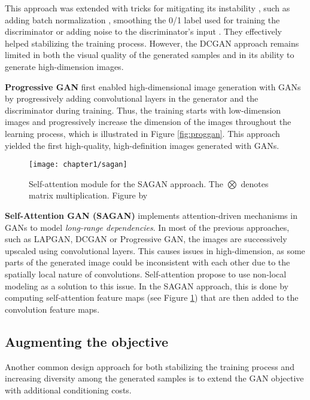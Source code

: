 This approach was extended  with tricks for mitigating its instability \citep{Salimans2016}, such as adding batch normalization \citep{Ioffe2015}, smoothing the 0/1 label used for training the discriminator or adding noise to the discriminator's input \citep{Sonderby2017}. They effectively helped stabilizing the training process. However, the \ac{DCGAN} approach remains limited in both the visual quality of the generated samples and in its ability to generate high-dimension images.

\textbf{Progressive GAN} \citep{Karras2017} first enabled high-dimensional image generation with GANs by progressively adding convolutional layers in the generator and the discriminator during training. Thus, the training starts with low-dimension images and progressively increase the dimension of the images throughout the learning process, which is illustrated in Figure \ref{fig:proggan}. This approach yielded the first high-quality, high-definition images generated with \ac{GANs}.

\begin{figure}
	\centering
	\texttt{[image: chapter1/sagan]}
	\caption[Self-attention module]{Self-attention module for the SAGAN approach. The $\bigotimes$ denotes matrix multiplication. Figure by \citet{Zhang2018}}
	\label{fig:sagan}
\end{figure}

\textbf{Self-Attention GAN (SAGAN)} \citep{Zhang2018} implements attention-driven  mechanisms in \ac{GANs} to model \textit{long-range dependencies}. In most of the previous approaches, such as LAPGAN, DCGAN or Progressive GAN, the images are successively upscaled using convolutional layers. This causes issues in high-dimension, as some parts of the generated image could be inconsistent with each other due to the spatially local nature of convolutions. Self-attention propose to use non-local modeling as a solution to this issue. In the SAGAN approach, this is done by computing self-attention feature maps (see Figure \ref{fig:sagan}) that are then added to the convolution feature maps. 

\subsection{Augmenting the objective}
\label{subs:augmented_objectives}

Another common design approach for both stabilizing the training process and increasing diversity among the generated samples is to extend the \ac{GAN} objective with additional conditioning costs.

